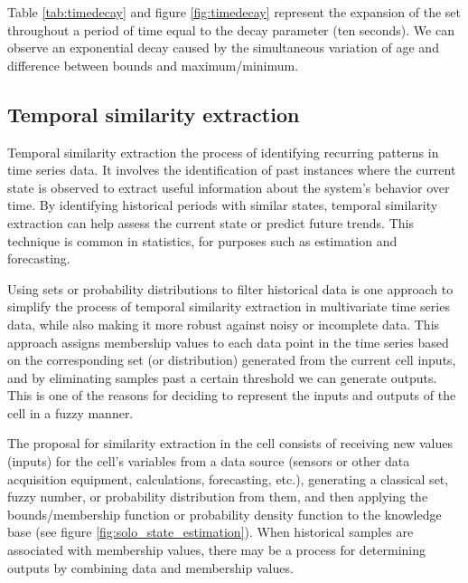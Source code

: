 
Table \ref{tab:timedecay} and figure \ref{fig:timedecay} represent the expansion of the set throughout a period of time equal to the decay parameter (ten seconds). We can observe an exponential decay caused by the simultaneous variation of age and difference between bounds and maximum/minimum.

\subsection{Temporal similarity extraction} \label{subsec:tempsim}

Temporal similarity extraction the process of identifying recurring patterns in time series data. It involves the identification of past instances where the current state is observed to extract useful information about the system's behavior over time. By identifying historical periods with similar states, temporal similarity extraction can help assess the current state or predict future trends. This technique is common in statistics, for purposes such as estimation and forecasting.

Using sets or probability distributions to filter historical data is one approach to simplify the process of temporal similarity extraction in multivariate time series data, while also making it more robust against noisy or incomplete data. This approach assigns membership values to each data point in the time series based on the corresponding set (or distribution) generated from the current cell inputs, and by eliminating samples past a certain threshold we can generate outputs. This is one of the reasons for deciding to represent the inputs and outputs of the cell in a fuzzy manner. 

The proposal for similarity extraction in the cell consists of receiving new values (inputs) for the cell's variables from a data source (sensors or other data acquisition equipment, calculations, forecasting, etc.), generating a classical set, fuzzy number, or probability distribution from them, and then applying the bounds/membership function or probability density function to the knowledge base (see figure \ref{fig:solo_state_estimation}). When historical samples are associated with membership values, there may be a process for determining outputs by combining data and membership values.

